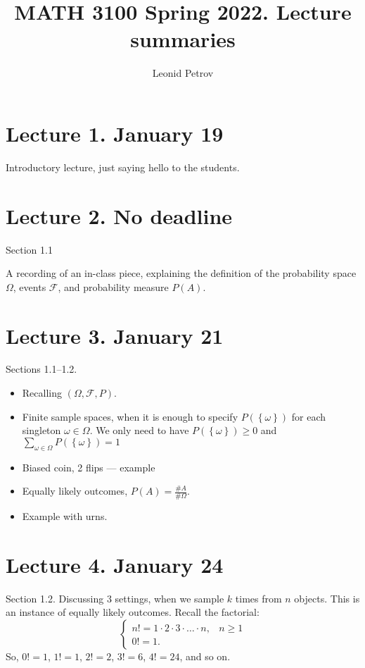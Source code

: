 \documentclass[letterpaper,11pt,oneside,reqno]{amsart}
\numberwithin{equation}{section}
\theoremstyle{definition}
\begin{document}
\title{MATH 3100 Spring 2022. Lecture summaries}


\author{Leonid Petrov}

\date{}

\maketitle

\section{Lecture 1. January 19}

Introductory lecture, just saying hello to the students.

\section{Lecture 2. No deadline}

Section 1.1

A recording of an in-class piece, explaining 
the definition of the
probability space $\Omega$, events $\mathcal{F}$, 
and probability measure $P(A)$.

\section{Lecture 3. January 21}

Sections 1.1--1.2.

\begin{itemize}
	\item 
Recalling $(\Omega,\mathcal{F},P)$. 
\item 
Finite sample spaces, when it is 
enough to specify $P(\left\{ \omega \right\})$ for each singleton $\omega\in \Omega$.
We only need to have $P(\left\{ \omega \right\})\ge0$ and $\sum_{\omega\in \Omega}P\left( \left\{ \omega \right\} \right)=1$
\item Biased coin, 2 flips --- example
\item Equally likely outcomes, $P(A)=\frac{\# A}{\#\Omega}$. 
\item Example with urns.
\end{itemize}

\section{Lecture 4. January 24}

Section 1.2. Discussing 3 settings,
when we sample $k$ times from $n$ objects. This is an instance of equally likely
outcomes.
Recall the factorial:
\begin{equation*}
	\begin{cases}
		n!=1\cdot 2\cdot 3\cdot \ldots\cdot n,&n\ge1 
		\\
		0!=1.
	\end{cases}
\end{equation*}
So, $0!=1$, $1!=1$, $2!=2$, $3!=6$, $4!=24$, and so on.
\end{document}
